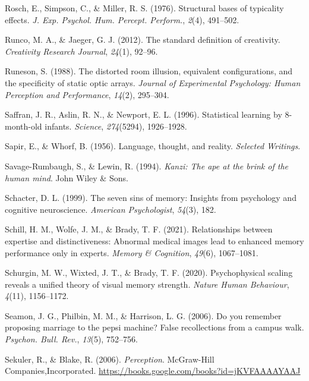 \documentclass[
]{krantz}
\newlength{\cslhangindent}
\newenvironment{CSLReferences}[2] %
 {\begin{list}{}{%
  \setlength{\itemindent}{0pt}
  \setlength{\leftmargin}{0pt}
  \setlength{\parsep}{0pt}
  \ifodd #1
   \setlength{\leftmargin}{\cslhangindent}
   \setlength{\itemindent}{-1\cslhangindent}
  \fi
  \setlength{\itemsep}{#2\baselineskip}}}
 {\end{list}}
\begin{document}
\begin{CSLReferences}{1}{0}
Rosch, E., Simpson, C., \& Miller, R. S. (1976). Structural bases of typicality effects. \emph{J. Exp. Psychol. Hum. Percept. Perform.}, \emph{2}(4), 491--502.

Runco, M. A., \& Jaeger, G. J. (2012). The standard definition of creativity. \emph{Creativity Research Journal}, \emph{24}(1), 92--96.

Runeson, S. (1988). The distorted room illusion, equivalent configurations, and the specificity of static optic arrays. \emph{Journal of Experimental Psychology: Human Perception and Performance}, \emph{14}(2), 295--304.

Saffran, J. R., Aslin, R. N., \& Newport, E. L. (1996). Statistical learning by 8-month-old infants. \emph{Science}, \emph{274}(5294), 1926--1928.

Sapir, E., \& Whorf, B. (1956). Language, thought, and reality. \emph{Selected Writings}.

Savage-Rumbaugh, S., \& Lewin, R. (1994). \emph{Kanzi: The ape at the brink of the human mind}. John Wiley \& Sons.

Schacter, D. L. (1999). The seven sins of memory: Insights from psychology and cognitive neuroscience. \emph{American Psychologist}, \emph{54}(3), 182.

Schill, H. M., Wolfe, J. M., \& Brady, T. F. (2021). Relationships between expertise and distinctiveness: Abnormal medical images lead to enhanced memory performance only in experts. \emph{Memory \& Cognition}, \emph{49}(6), 1067--1081.

Schurgin, M. W., Wixted, J. T., \& Brady, T. F. (2020). Psychophysical scaling reveals a unified theory of visual memory strength. \emph{Nature Human Behaviour}, \emph{4}(11), 1156--1172.

Seamon, J. G., Philbin, M. M., \& Harrison, L. G. (2006). Do you remember proposing marriage to the pepsi machine? False recollections from a campus walk. \emph{Psychon. Bull. Rev.}, \emph{13}(5), 752--756.

Sekuler, R., \& Blake, R. (2006). \emph{Perception}. McGraw-Hill Companies,Incorporated. \url{https://books.google.com/books?id=jKVFAAAAYAAJ}


\end{CSLReferences}
\end{document}
